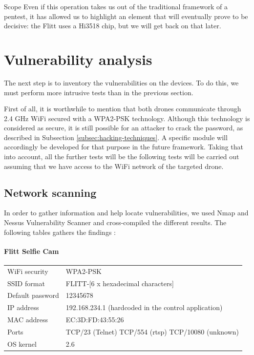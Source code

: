 \begin{chaptercover}{Scope}
Even if this operation takes us out of the traditional framework of a pentest, it has allowed us to highlight an element that will eventually prove to be decisive: the Flitt uses a Hi3518 chip, but we will get back on that later.

\section{Vulnerability analysis}

The next step is to inventory the vulnerabilities on the devices. To do this, we must perform more intrusive tests than in the previous section.

\begin{tip}
First of all, it is worthwhile to mention that both drones communicate through 2.4 GHz WiFi secured with a WPA2-PSK technology. Although this technology is considered as secure, it is still possible for an attacker to crack the password, as described in Subsection \ref{subsec:hacking-techniques}. A specific module will accordingly be developed for that purpose in the future framework. Taking that into account, all the further tests will be the following tests will be carried out assuming that we have access to the WiFi network of the targeted drone.
\end{tip}

\subsection{Network scanning}

In order to gather information and help locate vulnerabilities, we used Nmap and Nessus Vulnerability Scanner and cross-compiled the different results. The following tables gathers the findings :

\paragraph{Flitt Selfie Cam}

\begingroup
\renewcommand*{\arraystretch}{1.3}
\begin{center}
\begin{tabular}{L{4cm}L{10cm}}
  WiFi security & WPA2-PSK \\
  SSID format & FLITT-[6 x hexadecimal characters] \\
  Default password & 12345678 \\
  IP address & 192.168.234.1 (hardcoded in the control application) \\
  MAC address & EC:3D:FD:43:55:26 \\
  Ports & TCP/23 (Telnet) \newline TCP/554 (\acrshort{rtsp}) \newline TCP/10080 (unknown) \\
  OS kernel & 2.6 \\
\end{tabular}
\end{center}
\endgroup


\end{chaptercover}
